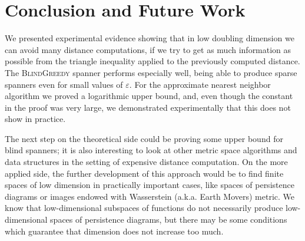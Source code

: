 \documentclass[a4paper,USenglish]{socg-lipics-v2018}
\newcommand{\eps}{\varepsilon}
\begin{document}


\section{Conclusion and Future Work}
\label{sec:conclusion}
We presented experimental evidence showing that in low
doubling dimension we can avoid many distance computations,
if we try to get as much information as possible from the triangle inequality
applied to the previously computed distance. The \textsc{BlindGreedy} spanner
performs especially well, being able to produce  sparse spanners even for small values of  $\eps$.
For the approximate nearest neighbor algorithm we proved a logarithmic upper bound,
and, even though the constant in the proof was very large, we demonstrated
experimentally that this does not show in practice.

The next step on the theoretical side could be proving some upper bound
for blind spanners; it is also interesting to look at other metric space
algorithms and data structures in the setting of expensive distance computation.
On the more applied side, the further development of this approach would
be to find finite spaces of low dimension in practically
important cases, like spaces of persistence diagrams or images endowed with Wasserstein (a.k.a. Earth Movers)
metric. We know that low-dimensional subspaces of functions do not necessarily produce
low-dimensional spaces of persistence diagrams, but there may be some conditions
which guarantee that dimension does not increase too much.




\end{document}

